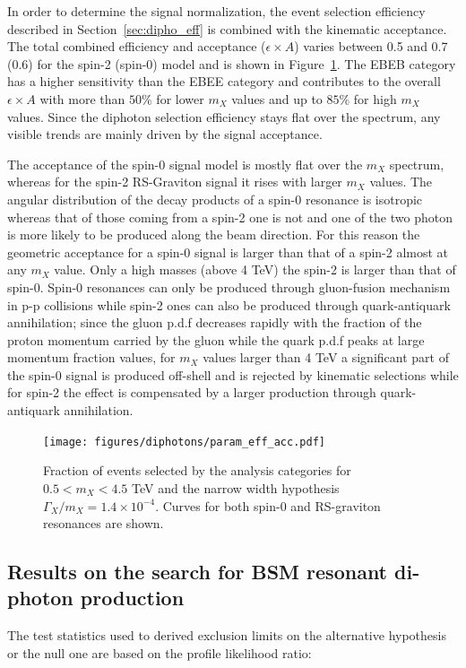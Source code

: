 \clearpage

In order to determine the signal normalization, the event selection efficiency
described in Section~\ref{sec:dipho_eff} is combined with the kinematic acceptance.
The total combined efficiency and acceptance ($\epsilon\times A$)
varies between 0.5 and 0.7 (0.6) for the spin-2 (spin-0) model and is shown in Figure~\ref{fig:eff_times_acc}. The EBEB
category has a higher sensitivity than the EBEE category and contributes to the overall
$\epsilon\times A$ with more than $50\%$ for lower $m_X$ values and up to $85\%$ for high $m_X$ values. Since
the diphoton selection efficiency stays flat over the \mgg spectrum, any
visible trends are mainly driven by the signal acceptance.

The acceptance of the spin-0 signal model is mostly flat over the $m_X$ spectrum,
whereas for the spin-2 RS-Graviton signal it rises with larger $m_X$ values.
The angular distribution of the decay products of a spin-0 resonance is isotropic 
whereas that of those coming from a spin-2 one is not and one of the two photon is more likely
to be produced along the beam direction.
For this reason the geometric acceptance for a spin-0 signal is larger than that of a spin-2
almost at any $m_X$ value. Only a high masses (above 4 TeV) the spin-2 is larger than that of spin-0.
Spin-0 resonances can only be produced through gluon-fusion mechanism in p-p collisions while
spin-2 ones can also be produced through quark-antiquark annihilation; since
the gluon p.d.f decreases rapidly with the fraction of the proton momentum carried by the gluon while 
the quark p.d.f peaks at large momentum fraction values, for $m_X$ values larger than 4 TeV a significant
part of the spin-0 signal is produced off-shell and is rejected by kinematic selections while for spin-2
the effect is compensated by a larger production through quark-antiquark annihilation.

\begin{figure}[!h]
  \centering
  \texttt{[image: figures/diphotons/param\_eff\_acc.pdf]}
  \caption{Fraction of events selected by the analysis categories for
    $0.5 < m_X < 4.5$ TeV and the narrow width hypothesis $\Gamma_X/m_X = 1.4\times 10^{-4}$.
    Curves for both spin-0 and RS-graviton resonances are shown.}
  \label{fig:eff_times_acc}
\end{figure}

\subsection{Results on the search for BSM resonant di-photon production}
The test statistics used to derived exclusion limits on the alternative hypothesis or the
null one are based on the profile likelihood ratio:

